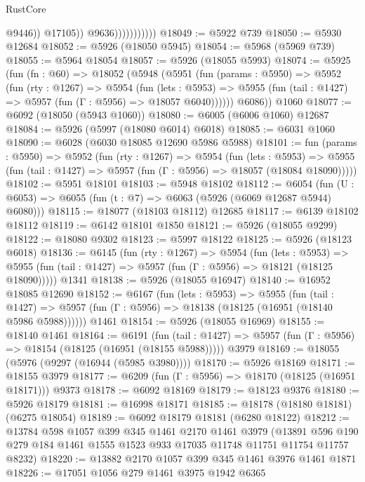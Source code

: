 \begin{lexlean}{RustCore}
\begin{coremodule}
                                  @9446))
                              @17105))
                          @9636)))))))))))
@18049 := @5922 @739
@18050 := @5930 @12684
@18052 := @5926 (@18050 @5945)
@18054 := @5968 (@5969 @739)
@18055 := @5964 @18054
@18057 := @5926 (@18055 @5993)
@18074 := @5925
    (fun (fn : @60) =>
    @18052
      (@5948
        (@5951
          (fun (params : @5950) =>
          @5952
            (fun (rty : @1267) =>
            @5954
              (fun (lets : @5953) =>
              @5955 (fun (tail : @1427) => @5957 (fun (Γ : @5956) => @18057 @6040))))))
        @6086))
    @1060
@18077 := @6092 (@18050 (@5943 @1060))
@18080 := @6005 (@6006 @1060) @12687
@18084 := @5926 (@5997 (@18080 @6014) @6018)
@18085 := @6031 @1060
@18090 := @6028 (@6030 @18085 @12690 @5986 @5988)
@18101 := fun (params : @5950) =>
  @5952
    (fun (rty : @1267) =>
    @5954
      (fun (lets : @5953) =>
      @5955 (fun (tail : @1427) => @5957 (fun (Γ : @5956) => @18057 (@18084 @18090)))))
@18102 := @5951 @18101
@18103 := @5948 @18102
@18112 := @6054
    (fun (U : @6053) => @6055 (fun (t : @7) => @6063 (@5926 (@6069 @12687 @5944) @6080)))
@18115 := @18077 (@18103 @18112) @12685
@18117 := @6139 @18102 @18112
@18119 := @6142 @18101 @1850
@18121 := @5926 (@18055 @9299)
@18122 := @18080 @9302
@18123 := @5997 @18122
@18125 := @5926 (@18123 @6018)
@18136 := @6145
    (fun (rty : @1267) =>
    @5954
      (fun (lets : @5953) =>
      @5955 (fun (tail : @1427) => @5957 (fun (Γ : @5956) => @18121 (@18125 @18090)))))
    @1341
@18138 := @5926 (@18055 @16947)
@18140 := @16952 @18085 @12690
@18152 := @6167
    (fun (lets : @5953) =>
    @5955
      (fun (tail : @1427) =>
      @5957 (fun (Γ : @5956) => @18138 (@18125 (@16951 (@18140 @5986 @5988))))))
    @1461
@18154 := @5926 (@18055 @16969)
@18155 := @18140 @1461
@18164 := @6191
    (fun (tail : @1427) => @5957 (fun (Γ : @5956) => @18154 (@18125 (@16951 (@18155 @5988)))))
    @3979
@18169 := @18055 (@5976 (@9297 (@16944 (@5985 @3980))))
@18170 := @5926 @18169
@18171 := @18155 @3979
@18177 := @6209 (fun (Γ : @5956) => @18170 (@18125 (@16951 @18171))) @9373
@18178 := @6092 @18169
@18179 := @18123 @9376
@18180 := @5926 @18179
@18181 := @16998 @18171
@18185 := @18178 (@18180 @18181) (@6275 @18054)
@18189 := @6092 @18179 @18181 (@6280 @18122)
@18212 := @13784
    @598
    @1057
    @399
    @345
    @1461
    @2170
    @1461
    @3979
    (@13891 @596 @190 @279 @184 @1461 @1555 @1523 @933 @17035 @11748 @11751 @11754 @11757 @8232)
@18220 := @13882 @2170 @1057 @399 @345 @1461 @3976 @1461 @1871
@18226 := @17051 @1056 @279 @1461 @3975 @1942 @6365

\end{coremodule}
\end{lexlean}
